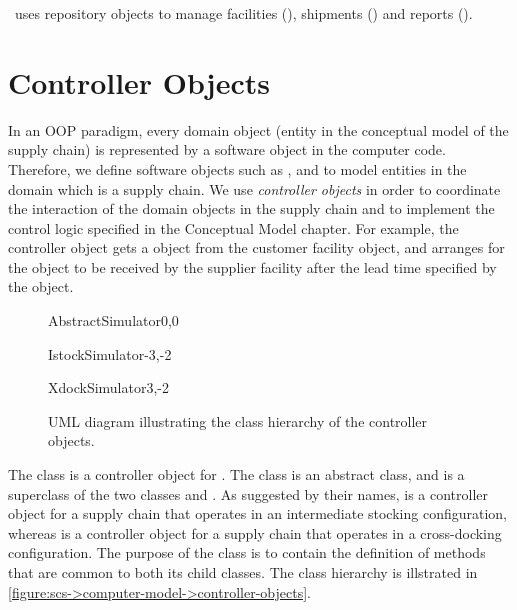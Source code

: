 \scs\ uses repository objects to manage
facilities (),
shipments ()
and reports ().




\section{Controller Objects}
\label{section:scs->computer-model->controller-objects}

In an OOP paradigm,
every domain object (entity in the conceptual model of the supply chain)
is represented by a software object in the computer code.
Therefore, we define software objects such as
,  and 
to model entities in the domain which is a supply chain.
We use \emph{controller objects}
in order to coordinate the interaction
of the domain objects in the supply chain
and to implement the control logic specified in the Conceptual Model chapter.
For example, the controller object
gets a  object from the customer facility object,
and arranges for the  object
to be received by the supplier facility
after the  lead time specified by the
 object.

\begin{figure}[h!]
\centering
\begin{myuml}
  \begin{abstractclass}{AbstractSimulator}{0,0}
  \end{abstractclass}

  \begin{class}{IstockSimulator}{-3,-2}
  \end{class}

  \begin{class}{XdockSimulator}{3,-2}
  \end{class}
\end{myuml}
\caption{UML diagram illustrating
the class hierarchy of the controller objects.}
\label{figure:scs->computer-model->controller-objects}
\end{figure}

The class  is a controller object for \scs.
The class  is an abstract class,
and is a superclass of the two classes
 and .
As suggested by their names,
 is a controller object
for a supply chain that operates in an intermediate stocking configuration,
whereas  is a controller object
for a supply chain that operates in a cross-docking configuration.
The purpose of the  class
is to contain the definition of methods
that are common to both its child classes.
The class hierarchy is illstrated in
\autoref{figure:scs->computer-model->controller-objects}.

